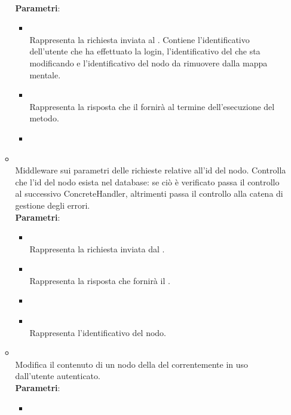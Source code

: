 \begin{itemize}
\begin{itemize}
\\ \textbf{Parametri}:
\begin{itemize}
\item {}
\\ Rappresenta la richiesta inviata al . Contiene l’identificativo dell’utente che ha effettuato la login, l’identificativo del  che sta modificando e l’identificativo del nodo da rimuovere dalla mappa mentale.
\item {}
\\ Rappresenta la risposta che il  fornirà al termine dell’esecuzione del metodo.
\item {}
\\ \dpNext
\end{itemize}
\item {}
\\ Middleware sui parametri delle richieste  relative all'id del nodo. Controlla che l'id del nodo esista nel database: se ciò è verificato passa il controllo al successivo ConcreteHandler, altrimenti passa il controllo alla catena di gestione degli errori.
\\ \textbf{Parametri}:
\begin{itemize}
\item {}
\\ Rappresenta la richiesta inviata dal .
\item {}
\\ Rappresenta la risposta che fornirà il .
\item {}
\\ \dpNext
\item {}
\\ Rappresenta l'identificativo del nodo.
\end{itemize}
\item {}
\\ Modifica il contenuto di un nodo della  del  correntemente in uso dall’utente autenticato.
\\ \textbf{Parametri}:
\begin{itemize}
\item {}

\end{itemize}
\end{itemize}
\end{itemize}
